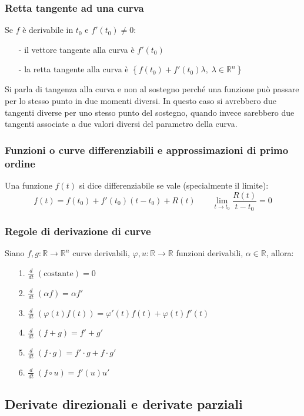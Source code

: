 \documentclass[a4paper]{article}
\newcommand\R{\mathbb{R}}     %
\newcommand\Rn{\mathbb{R}^n}  %
\newcommand\dt{\frac{d}{dt}}  %
\begin{document}
\subsubsection*{Retta tangente ad una curva}
Se \(f\) è derivabile in \(t_0\) e \(f'(t_0) \neq 0\):
\begin{itemize}[topsep=3pt, itemsep=0pt]
	\item[-] il vettore tangente alla curva è \(f'(t_0)\)
	\item[-] la retta tangente alla curva è \(\left\{ f(t_0) + f'(t_0) \lambda, \; \lambda \in \Rn \right\}\)
\end{itemize}
Si parla di tangenza alla curva e non al sostegno perché una funzione può passare per lo stesso punto in due momenti diversi. In
questo caso si avrebbero due tangenti diverse per uno stesso punto del sostegno, quando invece sarebbero due tangenti associate a
due valori diversi del parametro della curva.

\subsubsection*{Funzioni o curve differenziabili e approssimazioni di primo ordine}
Una funzione \(f(t)\) si dice differenziabile se vale (specialmente il limite):
\[f(t) = f(t_0) + f'(t_0) (t-t_0) + R(t) \qquad \lim_{t \to t_0} \frac{R(t)}{t-t_0} = 0\]

\subsubsection*{Regole di derivazione di curve}
Siano \(f,g : \R \to \Rn\) curve derivabili, \(\varphi,u : \R \to \R\) funzioni derivabili, \(\alpha \in \R\), allora:
\begin{itemize}[topsep=3pt, itemsep=0pt]
	\item[1.] \(\dt \; \left(\text{costante}\right) = 0\)
	\item[2.] \(\dt \; \left(\alpha f\right) = \alpha f'\)
	\item[3.] \(\dt \; \left(\varphi(t)f(t)\right) = \varphi'(t)f(t) + \varphi(t)f'(t)\)
	\item[4.] \(\dt \; \left(f + g\right) = f' + g'\)
	\item[5.] \(\dt \; \left(f \cdot g\right) = f' \cdot g + f \cdot g'\)
	\item[6.] \(\dt \; \left(f \circ u\right) = f'(u)u'\)
\end{itemize}

\subsection{Derivate direzionali e derivate parziali}
\end{document}
